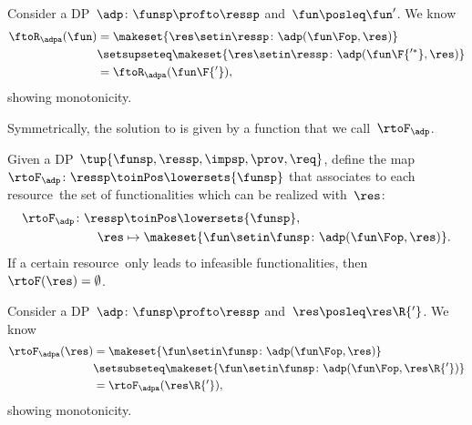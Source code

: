 \begin{remark}[Monotonicity]
    Consider a DP~$\adp\colon\funsp\profto\ressp$ and~$\fun\posleq \fun'$.
    We know
    \begin{equation*}
        \begin{aligned}
            \ftoR_\adpa(\fun) & =\makeset{ \res \setin \ressp \colon \adp(\fun\Fop, \res)} \\
                              & \setsupseteq \makeset{ \res \setin \ressp \colon \adp(\fun\F{'^*}, \res)} \\
                              & =\ftoR_\adpa(\fun\F{'}),
        \end{aligned}
    \end{equation*}
    showing monotonicity.
\end{remark}

Symmetrically, the solution to \FixResMaxFun is given by a function that we call~$\rtoF_\adp$.

\begin{definition}
    \label{def:rtoF-dp}
    Given a DP~$\tup{ \funsp,\ressp,\impsp,\prov,\req}$, define the map~$\rtoF_{\adp}\colon \ressp\toinPos  \lowersets{\funsp}$ that associates to each resource~\res the set of functionalities which can be realized with~$\res$:
    \begin{equation*}
        \begin{aligned}
            \rtoF_{\adp}\colon \ressp & \toinPos \lowersets{\funsp}, \\
            \res                      & \mapsto \makeset{ \fun \setin \funsp \colon \adp(\fun\Fop, \res)}.
        \end{aligned}
    \end{equation*}
    If a certain resource~\res only leads to infeasible functionalities, then~$\rtoF(\res)=\emptyset$.
\end{definition}

\begin{remark}[Monotonicity]
    Consider a DP~$\adp\colon\funsp\profto\ressp$ and~$\res\posleq \res\R{'}$.
    We know
    \begin{equation*}
        \begin{aligned}
            \rtoF_\adpa(\res) & =\makeset{ \fun \setin \funsp \colon \adp(\fun\Fop, \res)} \\
                              & \setsubseteq \makeset{ \fun \setin \funsp \colon \adp(\fun\Fop, \res\R{'})} \\
                              & =\rtoF_\adpa(\res\R{'}),
        \end{aligned}
    \end{equation*}
    showing monotonicity.
\end{remark}

